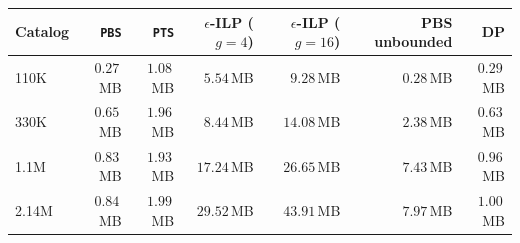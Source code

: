 \begin{tabular}{lrrrrrr}
\toprule
Catalog & \texttt{PBS} & \texttt{PTS} & $\epsilon$-ILP ($g{=}4$) & $\epsilon$-ILP ($g{=}16$) & PBS unbounded & DP \\
\midrule
110K & $0.27$\,MB & $1.08$\,MB & $5.54$\,MB & $9.28$\,MB & $0.28$\,MB & $0.29$\,MB \\
330K & $0.65$\,MB & $1.96$\,MB & $8.44$\,MB & $14.08$\,MB & $2.38$\,MB & $0.63$\,MB \\
1.1M & $0.83$\,MB & $1.93$\,MB & $17.24$\,MB & $26.65$\,MB & $7.43$\,MB & $0.96$\,MB \\
2.14M & $0.84$\,MB & $1.99$\,MB & $29.52$\,MB & $43.91$\,MB & $7.97$\,MB & $1.00$\,MB \\
\bottomrule
\end{tabular}
